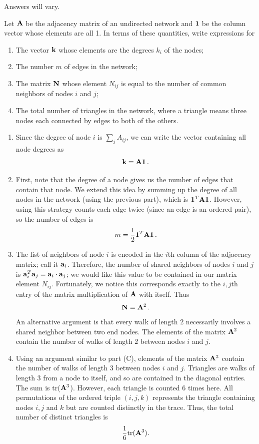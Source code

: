 \documentclass[11pt]{article}
\begin{document}
Answers will vary.

\newpage
\begin{tcolorbox}[title = 2. (Newman 6.4)]
    Let $\bf{A}$ be the adjacency matrix of an undirected network and $\bf{1}$ be the column vector whose elements are all 1. In terms of these quantities, write expressions for
    \begin{enumerate}
        \item The vector $\bf{k}$ whose elements are the degrees $k_i$ of the nodes;
        \item The number $m$ of edges in the network;
        \item The matrix ${\bf N}$ whose element $N_{ij}$ is equal to the number of common neighbors of nodes $i$ and $j$;
        \item The total number of triangles in the network, where a triangle means three nodes each connected by edges to both of the others.
    \end{enumerate}
\end{tcolorbox}

\begin{enumerate}
    \item Since the degree of node $i$ is $\sum_j A_{ij}$, we can write the vector containing all node degrees as 
    \[
        {\bf k} = {\bf A} {\bf 1} \,.
    \]
    \item First, note that the degree of a node gives us the number of edges that contain that node. We extend this idea by summing up the degree of all nodes in the network (using the previous part), which is ${\bf 1}^T {\bf A} {\bf 1}$. However, using this strategy counts each edge twice (since an edge is an ordered pair), so the number of edges is
    \[
        m = \frac{1}{2}{\bf 1}^T {\bf A} {\bf 1} \,.
    \]
    \item The list of neighbors of node $i$ is encoded in the $i$th column of the adjacency matrix; call it ${
    \bf a}_i$. Therefore, the number of shared neighbors of nodes $i$ and $j$ is ${\bf a}_i^T{\bf a}_j = {\bf a}_i \cdot {\bf a}_j$; we would like this value to be contained in our matrix element $N_{ij}$. Fortunately, we notice this corresponds exactly to the $i,j$th entry of the matrix multiplication of ${\bf A}$ with itself. Thus
    \[
        {\bf N} = {\bf A}^2 \,.
    \]
    An alternative argument is that every walk of length 2 necessarily involves a shared neighbor between two end nodes. The elements of the matrix ${\bf A}^2$ contain the number of walks of length 2 between nodes $i$ and $j.$
    \item Using an argument similar to part (C), elements of the matrix ${\bf A}^3$ contain the number of walks of length 3 between nodes $i$ and $j.$ Triangles are walks of length 3 from a node to itself, and so are contained in the diagonal entries. The sum is tr(${\bf A}^3$). However, each triangle is counted 6 times here. All permutations of the ordered triple $(i,j,k)$ represents the triangle containing nodes $i, j$ and $k$ but are counted distinctly in the trace. Thus, the total number of distinct triangles is
    \[
        \frac{1}{6}\text{tr}({\bf A}^3).
    \]
\end{enumerate}
\end{document}
